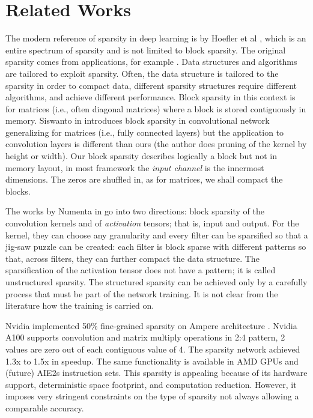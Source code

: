 \documentclass[conference]{IEEEtran}
\begin{document}
\section{Related Works}

The modern reference of sparsity in deep learning is by Hoefler et al
\cite{Hoefler2021}, which is an entire spectrum of sparsity and
is not limited to block sparsity. The original sparsity comes from
applications, for example \cite{Saad2003,Davis2006,Saad2020}. Data
structures and algorithms are tailored to exploit sparsity. Often, the
data structure is tailored to the sparsity in order to compact data,
different sparsity structures require different algorithms, and
achieve different performance. Block sparsity in this context is for
matrices (i.e., often diagonal matrices) where a block is stored
contiguously in memory. Siswanto in \cite{siswanto2021} introduces
block sparsity in convolutional network generalizing for matrices
(i.e., fully connected layers) but the application to convolution
layers is different than ours (the author does pruning of the kernel
by height or width). Our block sparsity describes logically a block
but not in memory layout, in most framework the {\em input channel} is
the innermost dimensions. The zeros are shuffled in, as for matrices,
we shall compact the blocks.

The works by Numenta in \cite{Ahmad2019,Hunter2022} go into two
directions: block sparsity of the convolution kernels and of {\em
  activation} tensors; that is, input and output. For the kernel, they
can choose any granularity and every filter can be sparsified so that
a jig-saw puzzle can be created: each filter is block sparse with
different patterns so that, across filters, they can further compact the
data structure. The sparsification of the activation tensor does not have a pattern; it is called unstructured
sparsity. The structured sparsity can be achieved only by a carefully
process that must be part of the network training. It is not clear
from the literature how the training is carried on.

Nvidia implemented 50\% fine-grained sparsity on Ampere architecture
\cite{Pool2020}.  Nvidia A100 supports convolution and matrix multiply
operations in 2:4 pattern, 2 values are zero out of each contiguous
value of 4.  The sparsity network achieved 1.3x to 1.5x in speedup.
The same functionality is available in AMD GPUs and (future) AIE2s
instruction sets. This sparsity is appealing because of its hardware
support, deterministic space footprint, and computation
reduction. However, it imposes very stringent constraints on the type
of sparsity not always allowing a comparable accuracy.
\end{document}
